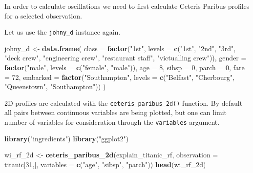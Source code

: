 \documentclass[12pt,]{krantz}
\newenvironment{Shaded}{\begin{snugshade}}{\end{snugshade}}
\newcommand{\DataTypeTok}[1]{\textcolor[rgb]{0.13,0.29,0.53}{#1}}
\newcommand{\DecValTok}[1]{\textcolor[rgb]{0.00,0.00,0.81}{#1}}
\newcommand{\KeywordTok}[1]{\textcolor[rgb]{0.13,0.29,0.53}{\textbf{#1}}}
\newcommand{\NormalTok}[1]{#1}
\newcommand{\StringTok}[1]{\textcolor[rgb]{0.31,0.60,0.02}{#1}}
\theoremstyle{definition}
\theoremstyle{definition}
\theoremstyle{definition}
\theoremstyle{remark}
\begin{document}
In order to calculate oscillations we need to first calculate Ceteris
Paribus profiles for a selected observation.

Let us use the \texttt{johny\_d} instance again.

\begin{Shaded}
\begin{Highlighting}[]
\NormalTok{johny_d <-}\StringTok{ }\KeywordTok{data.frame}\NormalTok{(}
  \DataTypeTok{class =} \KeywordTok{factor}\NormalTok{(}\StringTok{"1st"}\NormalTok{, }\DataTypeTok{levels =} \KeywordTok{c}\NormalTok{(}\StringTok{"1st"}\NormalTok{, }\StringTok{"2nd"}\NormalTok{, }\StringTok{"3rd"}\NormalTok{, }\StringTok{"deck crew"}\NormalTok{, }\StringTok{"engineering crew"}\NormalTok{, }
                                  \StringTok{"restaurant staff"}\NormalTok{, }\StringTok{"victualling crew"}\NormalTok{)),}
  \DataTypeTok{gender =} \KeywordTok{factor}\NormalTok{(}\StringTok{"male"}\NormalTok{, }\DataTypeTok{levels =} \KeywordTok{c}\NormalTok{(}\StringTok{"female"}\NormalTok{, }\StringTok{"male"}\NormalTok{)),}
  \DataTypeTok{age =} \DecValTok{8}\NormalTok{,}
  \DataTypeTok{sibsp =} \DecValTok{0}\NormalTok{,}
  \DataTypeTok{parch =} \DecValTok{0}\NormalTok{,}
  \DataTypeTok{fare =} \DecValTok{72}\NormalTok{,}
  \DataTypeTok{embarked =} \KeywordTok{factor}\NormalTok{(}\StringTok{"Southampton"}\NormalTok{, }\DataTypeTok{levels =} \KeywordTok{c}\NormalTok{(}\StringTok{"Belfast"}\NormalTok{, }\StringTok{"Cherbourg"}\NormalTok{, }\StringTok{"Queenstown"}\NormalTok{, }\StringTok{"Southampton"}\NormalTok{))}
\NormalTok{)}
\end{Highlighting}
\end{Shaded}

2D profiles are calculated with the \texttt{ceteris\_paribus\_2d()}
function. By default all pairs between continuous variables are being
plotted, but one can limit number of variables for consideration through
the \texttt{variables} argument.

\begin{Shaded}
\begin{Highlighting}[]
\KeywordTok{library}\NormalTok{(}\StringTok{"ingredients"}\NormalTok{)}
\KeywordTok{library}\NormalTok{(}\StringTok{"ggplot2"}\NormalTok{)}

\NormalTok{wi_rf_2d <-}\StringTok{ }\KeywordTok{ceteris_paribus_2d}\NormalTok{(explain_titanic_rf, }\DataTypeTok{observation =}\NormalTok{ titanic[}\DecValTok{31}\NormalTok{,], }\DataTypeTok{variables =} \KeywordTok{c}\NormalTok{(}\StringTok{"age"}\NormalTok{, }\StringTok{"sibsp"}\NormalTok{, }\StringTok{"parch"}\NormalTok{))}
\KeywordTok{head}\NormalTok{(wi_rf_2d)}
\end{Highlighting}
\end{Shaded}
\end{document}
